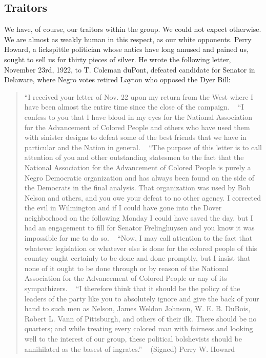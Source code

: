 \documentclass[letterpaper,10pt,english]{jupyterBook}
\begin{document}
\subsection{Traitors}
\label{\detokenize{Volumes/24/03/intentions:traitors}}
\sphinxAtStartPar
We have, of course, our traitors within the group. We could not expect otherwise. We are almost as weakly  human in this respect, as our white opponents. Perry Howard, a lickspittle politician whose antics have long amused and pained us, sought to sell us for thirty pieces of silver. He wrote the following letter, November 23rd, 1922, to T. Coleman duPont, defeated candidate for Senator in Delaware, where Negro votes retired Layton who opposed the Dyer Bill:
\begin{quote}

\sphinxAtStartPar
“I received your letter of Nov. 22 upon my return from the West where I have been almost the entire time since the close of the campaign.
 
“I confess to you that I have blood in my eyes for the National Association for the Advancement of Colored People and others who have used them with sinister designs to defeat some of the best friends that we have in particular and the Nation in general.
 
“The purpose of this letter is to call attention of you and other outstanding statesmen to the fact that the National Association for the Advancement of Colored People is purely a Negro Democratic organization and has always been found on the side of the Democrats in the final analysis. That organization was used by Bob Nelson and others, and you owe your defeat to no other agency. I corrected the evil in Wilmington and if I could have gone into the Dover neighborhood on the following Monday I could have saved the day, but I had an engagement to fill for Senator Frelinghuysen and you know it was impossible for me to do so.
 
“Now, I may call attention to the fact that whatever legislation or whatever else is done for the colored people of this country ought certainly to be done and done promptly, but I insist that none of it ought to be done through or by reason of the National Association for the Advancement of Colored People or any of its sympathizers.
 
“I therefore think that it should be the policy of the leaders of the party like you to absolutely ignore and give the back of your hand to such men as Nelson, James Weldon Johnson, W. E. B. DuBois, Robert L. Vann of Pittsburgh, and others of their ilk. There should be no quarters; and while treating every colored man with fairness and looking well to the interest of our group, these political bolshevists should be annihilated as the basest of ingrates.”
 
(Signed) Perry W. Howard
\end{quote}
\end{document}
